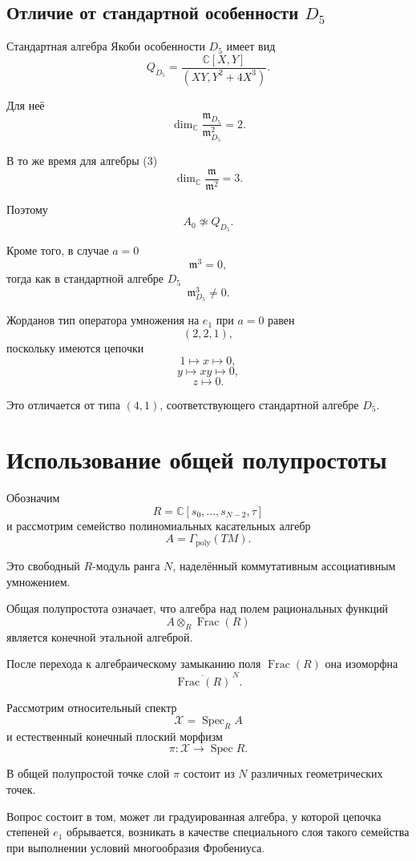 \subsection{Отличие от стандартной особенности $D_5$}

Стандартная алгебра Якоби особенности $D_5$
имеет вид
\[
Q_{D_5}=
\frac{\mathbb C[X,Y]}
{(XY,Y^2+4X^3)}.
\]

Для неё
\[
\dim_{\mathbb C}
\frac{\mathfrak m_{D_5}}
{\mathfrak m_{D_5}^2}=2.
\]

В то же время для алгебры (3)
\[
\dim_{\mathbb C}
\frac{\mathfrak m}{\mathfrak m^2}=3.
\]

Поэтому
\[
\boxed{A_0\not\simeq Q_{D_5}.}
\]

Кроме того, в случае $a=0$
\[
\mathfrak m^3=0,
\]
тогда как в стандартной алгебре $D_5$
\[
\mathfrak m_{D_5}^3\neq0.
\]

Жорданов тип оператора умножения на $e_1$
при $a=0$ равен
\[
\boxed{(2,2,1),}
\]
поскольку имеются цепочки
\[
1\longmapsto x\longmapsto0,
\]
\[
y\longmapsto xy\longmapsto0,
\]
\[
z\longmapsto0.
\]

Это отличается от типа $(4,1)$,
соответствующего стандартной алгебре $D_5$.


\section{Использование общей полупростоты}

Обозначим
\[
R=\mathbb C[s_0,\ldots,s_{N-2},\tau]
\]
и рассмотрим семейство полиномиальных
касательных алгебр
\[
A=\Gamma_{\mathrm{poly}}(TM).
\]

Это свободный $R$-модуль ранга $N$,
наделённый коммутативным ассоциативным
умножением.

Общая полупростота означает, что
алгебра над полем рациональных функций
\[
A\otimes_R\operatorname{Frac}(R)
\]
является конечной этальной алгеброй.

После перехода к алгебраическому замыканию
поля $\operatorname{Frac}(R)$ она изоморфна
\[
\overline{\operatorname{Frac}(R)}^{\,N}.
\]

Рассмотрим относительный спектр
\[
\mathcal X=\operatorname{Spec}_R A
\]
и естественный конечный плоский морфизм
\[
\pi:\mathcal X\longrightarrow
\operatorname{Spec}R.
\]

В общей полупростой точке слой $\pi$
состоит из $N$ различных геометрических точек.

Вопрос состоит в том, может ли градуированная
алгебра, у которой цепочка степеней $e_1$
обрывается, возникать в качестве специального
слоя такого семейства при выполнении
условий многообразия Фробениуса.

